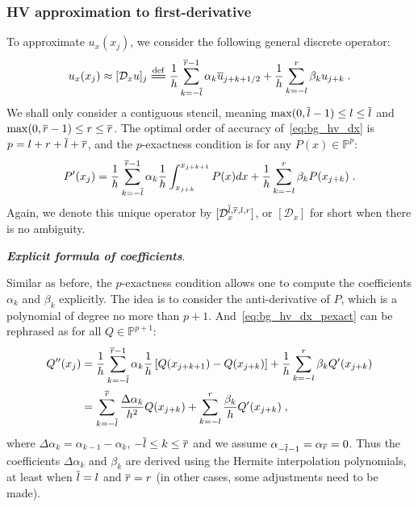 \subsubsection{HV approximation to first-derivative}
\label{sec:bg_hv_dx}
To approximate $u_x(x_j)$, we consider the following general discrete operator:
\begin{equation}\label{eq:bg_hv_dx}
  u_x(x_j) \approx [\mathcal{D}_xu]_j \eqdef \frac{1}{h}\sum_{k=-\bl}^{\br-1}\alpha_k\overline{u}_{\phf{j+k}}+\frac{1}{h}\sum_{k=-l}^r\beta_ku_{j+k}\;.
\end{equation}
We shall only consider a contiguous stencil, meaning $\max(0,\overline{l}-1)\le l\le \overline{l}$ and $\max(0,\overline{r}-1)\le r\le\overline{r}$.
The optimal order of accuracy of~\cref{eq:bg_hv_dx} is $p=l+r+\overline{l}+\overline{r}$, and the $p$-exactness condition is for any $P(x)\in\mathbb{P}^p$:
\begin{equation}\label{eq:bg_hv_dx_pexact}
  P'(x_j) = \frac{1}{h}\sum_{k=-\overline{l}}^{\overline{r}-1}\alpha_k\frac{1}{h}\int_{x_{j+k}}^{x_{j+k+1}}P(x)dx+\frac{1}{h}\sum_{k=-l}^r\beta_kP(x_{j+k})\;.
\end{equation}
Again, we denote this unique operator by $[\mathcal{D}^{\overline{l},\overline{r},l,r}_x]$, or $[\mathcal{D}_x]$ for short when there is no ambiguity.

\medskip

\noindent
\textbf{\textit{Explicit formula of coefficients}}.

\smallskip
Similar as before, the $p$-exactness condition allows one to compute the coefficients $\alpha_k$ and $\beta_k$ explicitly.
The idea is to consider the anti-derivative of $P$, which is a polynomial of degree no more than $p+1$.
And~\cref{eq:bg_hv_dx_pexact} can be rephrased as for all $Q\in\mathbb{P}^{p+1}$:
\begin{align}
  \notag
  Q''(x_j) &= \frac{1}{h}\sum_{k=-\overline{l}}^{\overline{r}-1}\alpha_k\frac{1}{h}\left[Q(x_{j+k+1})-Q(x_{j+k})\right]+\frac{1}{h}\sum_{k=-l}^r\beta_kQ'(x_{j+k}) \\
  \label{eq:bg_hv_dx_qexact}
  &= \sum_{k=-\overline{l}}^{\overline{r}}\frac{\Delta\alpha_k}{h^2}Q(x_{j+k}) + \sum_{k=-l}^{r}\frac{\beta_k}{h}Q'(x_{j+k})\;,
\end{align}
where $\Delta\alpha_k=\alpha_{k-1}-\alpha_k$, $-\overline{l}\le k\le\overline{r}$ and we assume $\alpha_{-\overline{l}-1}=\alpha_{\overline{r}}=0$.
Thus the coefficients $\Delta\alpha_k$ and $\beta_k$ are derived using the Hermite interpolation polynomials, at least when $\overline{l}=l$ and $\overline{r}=r$ (in other cases, some adjustments need to be made).


